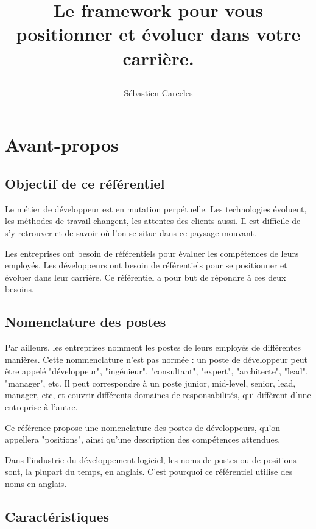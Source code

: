 \documentclass[a4paper, french, openany, 12pt]{book}
\title{
  \vspace*{-8cm}

  \fullwidthimage{images/cover.jpg}

  \vspace*{5cm}

  \bsc{Référenciel de compétences pour développeurs et développeuses}

  Le framework pour vous positionner et évoluer dans votre carrière.
}
\author{Sébastien Carceles}
\date{}
\begin{document}
\begin{titlepage}
  \maketitle
\end{titlepage}

\frontmatter

\chapter{Avant-propos}

\section*{Objectif de ce référentiel}

Le métier de développeur est en mutation perpétuelle.
Les technologies évoluent, les méthodes de travail changent, les attentes des clients aussi.
Il est difficile de s'y retrouver et de savoir où l'on se situe dans ce paysage mouvant.

Les entreprises ont besoin de référentiels pour évaluer les compétences de leurs employés.
Les développeurs ont besoin de référentiels pour se positionner et évoluer dans leur carrière.
Ce référentiel a pour but de répondre à ces deux besoins.

\section*{Nomenclature des postes}

Par ailleurs, les entreprises nomment les postes de leurs employés de différentes manières.
Cette nommenclature n'est pas normée : un poste de développeur peut être appelé "développeur", "ingénieur", 
"consultant", "expert", "architecte", "lead", "manager", etc.
Il peut correspondre à un poste junior, mid-level, senior, lead, manager, etc, et couvrir différents domaines de 
responsabilités, qui diffèrent d'une entreprise à l'autre.

Ce référence propose une nomenclature des postes de développeurs, qu'on appellera "positions",
ainsi qu'une description des compétences attendues.

Dans l'industrie du développement logiciel, les noms de postes ou de positions sont, la plupart du temps, en anglais.
C'est pourquoi ce référentiel utilise des noms en anglais.

\section*{Caractéristiques}
\end{document}
